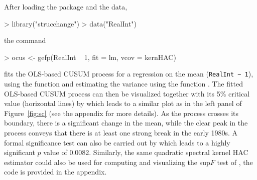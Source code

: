 \documentclass{Z}
\begin{document}
After loading the package and the data,
\begin{Schunk}
\begin{Sinput}
> library("strucchange")
> data("RealInt")
\end{Sinput}
\end{Schunk}
the command
\begin{Schunk}
\begin{Sinput}
> ocus <- gefp(RealInt ~ 1, fit = lm, vcov = kernHAC)
\end{Sinput}
\end{Schunk}
fits the OLS-based CUSUM process for a regression on the mean (\verb/RealInt ~ 1/),
using the function  and estimating the variance using the function
. The fitted OLS-based CUSUM process can then be visualized together
with its 5\% critical value (horizontal lines) by  which leads to
a similar plot as in the left panel of Figure~\ref{fig:sc} (see the appendix for more details).
As the process crosses its boundary, there is a significant change in the mean, while
the clear peak in the process conveys that there is at least one strong break in the
early 1980s. A formal significance test can also be carried out by 
which leads to a highly significant $p$ value of 0.0082.
Similarly, the same quadratic spectral kernel HAC estimator could also be used for
computing and visualizing the sup$F$ test of \cite{hac:Andrews:1993}, the code is provided 
in the appendix.
\end{document}

